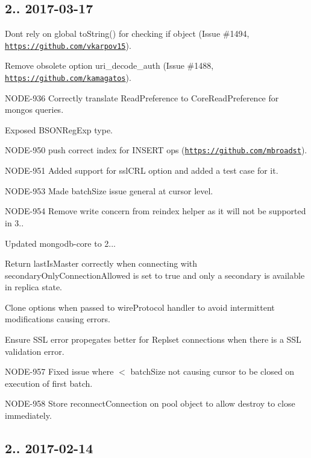 \subsection*{2.. 2017-\/03-\/17 }


\begin{DoxyItemize}
\item Don\textquotesingle{}t rely on global to\+String() for checking if object (Issue \#1494, \href{https://github.com/vkarpov15}{\tt https\+://github.\+com/vkarpov15}).
\item Remove obsolete option uri\+\_\+decode\+\_\+auth (Issue \#1488, \href{https://github.com/kamagatos}{\tt https\+://github.\+com/kamagatos}).
\item N\+O\+D\+E-\/936 Correctly translate Read\+Preference to Core\+Read\+Preference for mongos queries.
\item Exposed B\+S\+O\+N\+Reg\+Exp type.
\item N\+O\+D\+E-\/950 push correct index for I\+N\+S\+E\+RT ops (\href{https://github.com/mbroadst}{\tt https\+://github.\+com/mbroadst}).
\item N\+O\+D\+E-\/951 Added support for ssl\+C\+RL option and added a test case for it.
\item N\+O\+D\+E-\/953 Made batch\+Size issue general at cursor level.
\item N\+O\+D\+E-\/954 Remove write concern from reindex helper as it will not be supported in 3..
\item Updated mongodb-\/core to 2...
\begin{DoxyItemize}
\item Return last\+Is\+Master correctly when connecting with secondary\+Only\+Connection\+Allowed is set to true and only a secondary is available in replica state.
\item Clone options when passed to wire\+Protocol handler to avoid intermittent modifications causing errors.
\item Ensure S\+SL error propegates better for Replset connections when there is a S\+SL validation error.
\item N\+O\+D\+E-\/957 Fixed issue where $<$ batch\+Size not causing cursor to be closed on execution of first batch.
\item N\+O\+D\+E-\/958 Store reconnect\+Connection on pool object to allow destroy to close immediately.
\end{DoxyItemize}
\end{DoxyItemize}

\subsection*{2.. 2017-\/02-\/14 }


